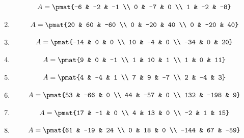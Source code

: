 \begin{enumerate}
\begin{align*}
A = \pmat{-6 & -2 & -1 \\ 0 & -7 & 0 \\ 1 & -2 & -8}
\end{align*}

\item

\begin{align*}
A = \pmat{20 & 60 & -60 \\ 0 & -20 & 40 \\ 0 & -20 & 40}
\end{align*}

\item

\begin{align*}
A = \pmat{-14 & 0 & 0 \\ 10 & -4 & 0 \\ -34 & 0 & 20}
\end{align*}

\item

\begin{align*}
A = \pmat{9 & 0 & -1 \\ 1 & 10 & 1 \\ 1 & 0 & 11}
\end{align*}

\item

\begin{align*}
A = \pmat{4 & -4 & 1 \\ 7 & 9 & -7 \\ 2 & -4 & 3}
\end{align*}

\item

\begin{align*}
A = \pmat{53 & -66 & 0 \\ 44 & -57 & 0 \\ 132 & -198 & 9}
\end{align*}

\item

\begin{align*}
A = \pmat{17 & -1 & 0 \\ 4 & 13 & 0 \\ -2 & 1 & 15}
\end{align*}

\item

\begin{align*}
A = \pmat{61 & -19 & 24 \\ 0 & 18 & 0 \\ -144 & 67 & -59}
\end{align*}


\end{enumerate}
